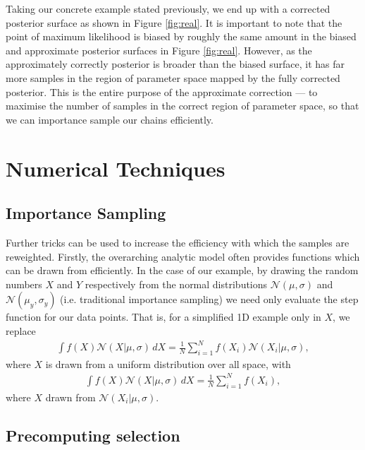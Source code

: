 \documentclass[a4paper,fleqn,usenatbib]{mnras}
\begin{document}
Taking our concrete example stated previously, we end up with a corrected posterior surface as shown in Figure \ref{fig:real}. It is important to note that the point of maximum likelihood is biased by roughly the same amount in the biased and approximate posterior surfaces in Figure \ref{fig:real}. However, as the approximately correctly posterior is broader than the biased surface, it has far more samples in the region of parameter space mapped by the fully corrected posterior. This is the entire purpose of the approximate correction --- to maximise the number of samples in the correct region of parameter space, so that we can importance sample our chains efficiently.














\section{Numerical Techniques}
\label{sec:tricks}

\subsection{Importance Sampling}
Further tricks can be used to increase the efficiency with which the samples are reweighted. Firstly, the overarching analytic model often provides functions which can be drawn from efficiently. In the case of our example, by drawing the random numbers $X$ and $Y$ respectively from the normal distributions $\mathcal{N}(\mu,\sigma)$ and $\mathcal{N}(\mu_y,\sigma_y)$ (i.e. traditional importance sampling) we need only evaluate the step function for our data points. That is, for a simplified 1D example only in $X$, we replace
\begin{align}
\int f(X) \mathcal{N}(X|\mu,\sigma)\, dX = \frac{1}{N} \sum_{i=1}^N f(X_i) \mathcal{N}(X_i | \mu, \sigma),
\end{align}
where $X$ is drawn from a uniform distribution over all space, with 
\begin{align}
\int f(X) \mathcal{N}(X|\mu,\sigma)\, dX = \frac{1}{N} \sum_{i=1}^N f(X_i),
\end{align}
where $X$ drawn from $\mathcal{N}(X_i | \mu, \sigma)$.

\subsection{Precomputing selection}
\end{document}
